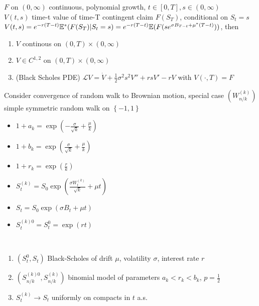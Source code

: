 \begin{prop}
    $F$ on $(0, \infty)$ continuous, polynomial growth, $t \in [0, T], s \in (0, \infty)$ \\
    $V(t, s)$ time-t value of time-T contingent claim $F(S_T)$, conditional on $S_t = s$\\
    $V(t, s) = e^{-r (T - t)}\mathbb{E}^*(F(S_T)|S_t = s) = e^{-r(T - t)} \mathbb{E}(F(se^{\sigma B_{T-t} + \mu^*(T-t)}))$, then
    \begin{enumerate}
        \item $V$ continous on $(0, T) \times (0, \infty)$
        \item $V \in C^{1,2}$ on $(0, T) \times (0, \infty)$
        \item (Black Scholes PDE) $\mathcal{L}V = \dot{V} + \frac{1}{2} \sigma^2 s^2 V'' + rsV' - rV$ with $V(\cdot, T) = F$
    \end{enumerate}
\end{prop}

\begin{setting}
    Consider convergence of random walk to Brownian motion, special case $(W_{n/k}^{(k)})$ simple symmetric random walk on $\left\{ -1, 1 \right\}$
\end{setting}

\begin{itemize}
    \item $1 + a_k = \exp\left( -\frac{\sigma}{\sqrt{k}} + \frac{\mu}{k} \right)$
    \item $1 + b_k = \exp\left( \frac{\sigma}{\sqrt{k}} + \frac{\mu}{k} \right)$
    \item $1 + r_k = \exp\left( \frac{r}{k} \right)$
    \item $S_t^{(k)} = S_0\exp\left( \frac{\sigma W_t^{(k)}}{\sqrt{k}} + \mu t \right)$
    \item $S_t = S_0 \exp\left( \sigma B_t + \mu t \right)$
    \item $S_t^{(k)0} = S_t^0 = \exp(rt)$
\end{itemize}

\begin{fact}\,
    \begin{enumerate}
        \item $(S_t^0, S_t)$ Black-Scholes of drift $\mu$, volatility $\sigma$, interest rate $r$
        \item $(S_{n/k}^{(k)0}, S_{n/k}^{(k)})$ binomial model of parameters $a_k < r_k < b_k$, $p = \frac{1}{2}$
        \item $S_t^{(k)} \rightarrow S_t$ uniformly on compacts in $t$ a.s.
    \end{enumerate}
\end{fact}


